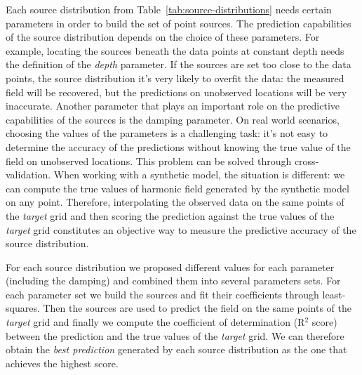 \documentclass[twocolumn]{article}
\begin{document}
Each source distribution from Table~\ref{tab:source-distributions} needs
certain parameters in order to build the set of point sources.
The prediction capabilities of the source distribution depends on the choice of
these parameters.
For example, locating the sources beneath the data points at constant depth
needs the definition of the \emph{depth} parameter.
If the sources are set too close to the data points, the source distribution
it's very likely to overfit the data: the measured field will be recovered, but
the predictions on unobserved locations will be very inaccurate.
Another parameter that plays an important role on the predictive capabilities
of the sources is the damping parameter.
On real world scenarios, choosing the values of the parameters is a challenging
task: it's not easy to determine the accuracy of the predictions without
knowing the true value of the field on unobserved locations.
This problem can be solved through cross-validation.
When working with a synthetic model, the situation is different: we can compute
the true values of harmonic field generated by the synthetic model on any
point.
Therefore, interpolating the observed data on the same points of the
\emph{target} grid and then scoring the prediction against the true values of
the \emph{target} grid constitutes an objective way to measure the predictive
accuracy of the source distribution.

For each source distribution we proposed different values for each parameter
(including the damping) and combined them into several parameters sets.
For each parameter set we build the sources and fit their coefficients through
least-squares.
Then the sources are used to predict the field on the same points of the
\emph{target} grid and finally we compute the coefficient of determination
(R$^2$ score) between the prediction and the true values of the \emph{target}
grid.
We can therefore obtain the \emph{best prediction} generated by each source
distribution as the one that achieves the highest score.
\end{document}
